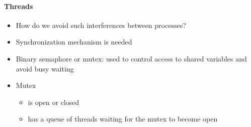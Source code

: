 \documentclass{beamer}
\begin{document}
\begin{frame}[fragile]
\framesubtitle{Threads}
\begin{scriptsize}
\begin{itemize}
\item<1-> How do we avoid such interferences between processes?

\item<2-> Synchronization mechanism is needed

\item<3-> Binary semaphore or mutex: used to control access to shared variables and avoid busy waiting

\item<4-> Mutex
\begin{itemize}
  \item is open or closed
  \item has a queue of threads waiting for the mutex to become open
\end{itemize}


\end{itemize}
\end{scriptsize}
\end{frame}
\end{document}
